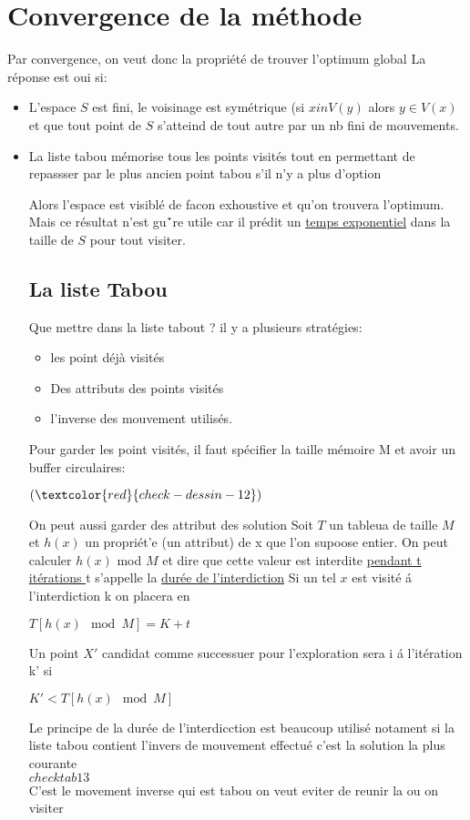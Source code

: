 \section{Convergence de la m\'ethode}
Par convergence, on veut donc la propri\'et\'e de trouver l'optimum global
La r\'eponse est oui si:
\begin{itemize}
\item L'espace $S$ est fini, le voisinage est sym\'etrique (si $x in V(y)$ alors $y \in V(x)$ et que tout point de $S$ s'atteind de tout autre  par un nb fini de mouvements.
\item La liste tabou m\'emorise tous les points visit\'es tout en permettant de repassser par le plus ancien point tabou s'il n'y a plus d'option

Alors l'espace est visibl\'e de facon exhoustive et qu'on trouvera l'optimum.
Mais ce r\'esultat n'est {gu\'`re} utile car il pr\'edit un \underline{temps exponentiel} dans la taille de $S$ pour tout visiter.

\subsection{La liste Tabou}
Que mettre dans la liste tabout ?
il y a plusieurs strat\'egies:
\begin{itemize}
\item les point d\'ej\`a visit\'es 
\item Des attributs des points visit\'es 
\item l'inverse des mouvement utilis\'es.

\end{itemize}
Pour garder les point visit\'es, il faut sp\'ecifier la taille m\'emoire M et avoir un buffer circulaires: 

$(\textcolor{red}{check- dessin - 12})$ 

On peut aussi garder des attribut des solution 
Soit $T$ un tableua de taille $M$ et $h(x)$ un propri\'et'e (un attribut) de x que l'on supoose entier.
On peut calculer $h(x)$ mod $M$ et dire que cette valeur est interdite \underline{pendant t it\'erations } t s'appelle la \underline{dur\'ee de l'interdiction}
Si un tel $x$ est visit\'e \'a l'interdiction k on placera en 
\begin{center}
$T[h(x) \mod M]= K+t$

\end{center}
Un point $X'$ candidat comme successuer pour l'exploration sera i \'a l'it\'eration k' si 
\begin{center}
$K' < T[h(x) \mod M]$
\end{center}
Le principe de la dur\'ee de l'interdicction est beaucoup utilis\'e notament si la liste tabou contient l'invers de mouvement effectu\'e c'est la solution la plus courante \\
$check tab 13$\\
C'est le movement inverse qui est tabou on veut eviter de reunir la ou on visiter 


\end{itemize}
